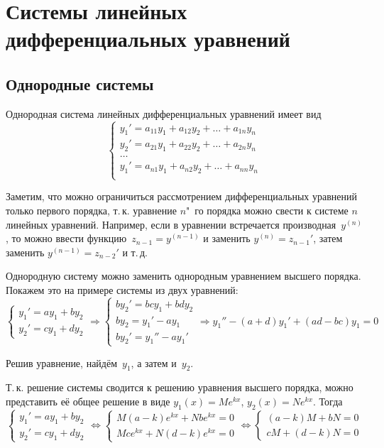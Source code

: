 \section{Системы линейных дифференциальных уравнений}
\subsection{Однородные системы}
Однородная система линейных дифференциальных уравнений имеет вид
\begin{equation*}
\begin{cases}
y_1' = a_{11} y_1 + a_{12} y_2 + \ldots + a_{1n} y_n \\
y_2' = a_{21} y_1 + a_{22} y_2 + \ldots + a_{2n} y_n \\
\ldots \\
y_1' = a_{n1} y_1 + a_{n2} y_2 + \ldots + a_{nn} y_n \\
\end{cases}
\end{equation*}

Заметим, что можно ограничиться рассмотрением дифференциальных уравнений только первого порядка, т.\,к. уравнение $n$"~го порядка можно свести к системе $n$ линейных уравнений.
Например, если в уравнении встречается производная~$y^{(n)}$, то можно ввести функцию~$z_{n-1} = y^{(n-1)}$ и заменить $y^{(n)} = z_{n-1}'$, затем заменить $y^{(n-1)} = z_{n-2}'$ и т.\,д.

Однородную систему можно заменить однородным уравнением высшего порядка.
Покажем это на примере системы из двух уравнений:
\begin{equation*}
\begin{cases}
y_1' = ay_1 + by_2 \\
y_2' = cy_1 + dy_2
\end{cases}
\Rightarrow
\begin{cases}
by_2' = bcy_1 + bdy_2 \\
by_2 = y_1' - ay_1 \\
by_2' = y_1'' - ay_1'
\end{cases}
\Rightarrow y_1'' - (a + d)y_1' + (ad - bc) y_1 = 0
\end{equation*}

Решив уравнение, найдём~$y_1$, а затем и~$y_2$.

Т.\,к. решение системы сводится к решению уравнения высшего порядка, можно представить её общее решение в виде $y_1(x) = M e^{kx}$, $y_2(x) = N e^{kx}$.
Тогда
\begin{equation}
\label{eq:homogeneous_system_after_substitution}
\begin{cases}
y_1' = ay_1 + by_2 \\
y_2' = cy_1 + dy_2
\end{cases}
\Leftrightarrow
\begin{cases}
M (a - k) e^{kx} + N b e^{kx} = 0 \\
M c e^{kx} + N (d - k) e^{kx} = 0
\end{cases}
\Leftrightarrow
\begin{cases}
(a - k) M + b N = 0 \\
c M + (d - k) N = 0
\end{cases}
\end{equation}

